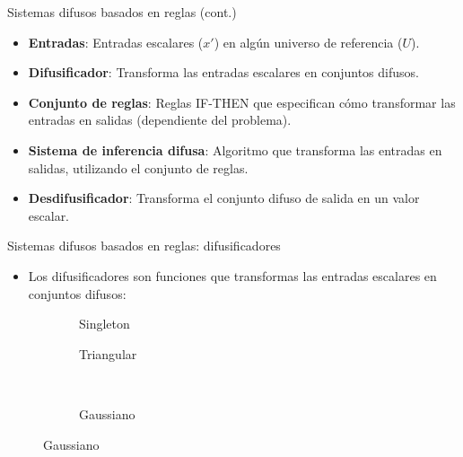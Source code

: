 \documentclass{beamer}
\begin{document}
\begin{frame}{Sistemas difusos basados en reglas (cont.)}
\begin{itemize}
\item \textbf{Entradas}: Entradas escalares ($x'$) en algún universo de referencia ($U$).
\item \textbf{Difusificador}: Transforma las entradas escalares en conjuntos difusos.
\item \textbf{Conjunto de reglas}: Reglas IF-THEN que especifican cómo transformar las entradas en salidas (dependiente del problema).
\item \textbf{Sistema de inferencia difusa}: Algoritmo que transforma las entradas en salidas, utilizando el conjunto de reglas.
\item \textbf{Desdifusificador}: Transforma el conjunto difuso de salida en un valor escalar.
\end{itemize}
\scriptsize

\end{frame}

\begin{frame}{Sistemas difusos basados en reglas: difusificadores}
\begin{itemize}
\item Los difusificadores son funciones que transformas las entradas escalares en conjuntos difusos:
\end{itemize}
	\begin{figure}
	\begin{subfigure}{0.45\textwidth}
		\caption{Singleton}
		\setlength\figureheight{2cm}
		\setlength\figurewidth{4cm}
		
	\end{subfigure}
	\qquad
	\begin{subfigure}{0.45\textwidth}
		\caption{Triangular}
		\setlength\figureheight{2cm}
		\setlength\figurewidth{4cm}
		
	\end{subfigure}
	\\
	\begin{subfigure}{0.45\textwidth}
		\caption{Gaussiano}
		\setlength\figureheight{2cm}
		\setlength\figurewidth{4cm}
		
	\end{subfigure}
	\end{figure}
\end{frame}
\end{document}

